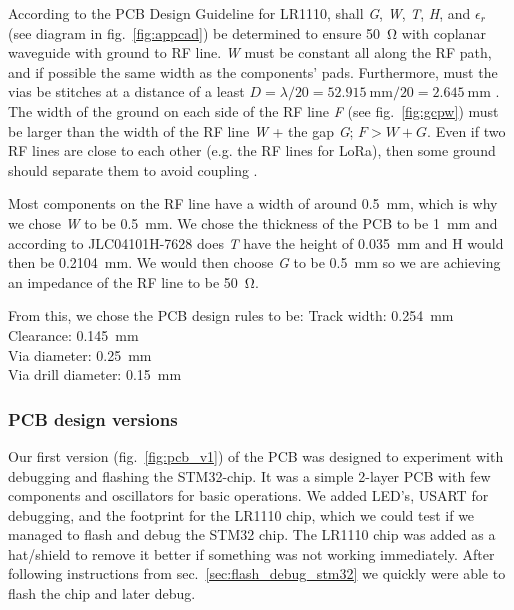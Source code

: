 According to the PCB Design Guideline for LR1110, shall \textit{G}, \textit{W}, \textit{T}, \textit{H}, and $\epsilon_r$ (see diagram in fig.~\ref{fig:appcad}) be determined to ensure \SI{50}{\ohm} with coplanar waveguide with ground to \ac{RF} line. \textit{W} must be constant all along the \ac{RF} path, and if possible the same width as the components' pads. Furthermore, must the vias be stitches at a distance of a least $D = \lambda / 20 = \SI{52.915}{\milli\meter} / 20 = \SI{2.645}{\milli\meter}$ \cite[p.~9-11]{LR1110_pcb_design_guide}. The width of the ground on each side of the \ac{RF} line \textit{F} (see fig.~\ref{fig:gcpw}) must be larger than the width of the \ac{RF} line \textit{W} + the gap \textit{G}; $F > W + G$. Even if two \ac{RF} lines are close to each other (e.g. the \ac{RF} lines for \ac{LoRa}), then some ground should separate them to avoid coupling \cite[p.~20-21]{LR1110_pcb_design_guide}.

Most components on the \ac{RF} line have a width of around \SI{0.5}{\milli\meter}, which is why we chose \textit{W} to be \SI{0.5}{\milli\meter}. We chose the thickness of the \ac{PCB} to be \SI{1}{\milli\meter} and according to JLC04101H-7628 does \textit{T} have the height of \SI{0.035}{\milli\meter} and H would then be \SI{0.2104}{\milli\meter}. We would then choose \textit{G} to be \SI{0.5}{\milli\meter} so we are achieving an impedance of the RF line to be \SI{50}{\ohm}.

From this, we chose the \ac{PCB} design rules to be:
Track width: \SI{0.254}{\milli\meter} \\
Clearance: \SI{0.145}{\milli\meter} \\
Via diameter: \SI{0.25}{\milli\meter} \\
Via drill diameter: \SI{0.15}{\milli\meter}

\subsubsection{PCB design versions}
Our first version (fig.~\ref{fig:pcb_v1}) of the \ac{PCB} was designed to experiment with debugging and flashing the STM32-chip. It was a simple 2-layer \ac{PCB} with few components and oscillators for basic operations. We added \ac{LED}'s, \ac{USART} for debugging, and the footprint for the LR1110 chip, which we could test if we managed to flash and debug the STM32 chip. The LR1110 chip was added as a hat/shield to remove it better if something was not working immediately. After following instructions from sec.~\ref{sec:flash_debug_stm32} we quickly were able to flash the chip and later debug.

